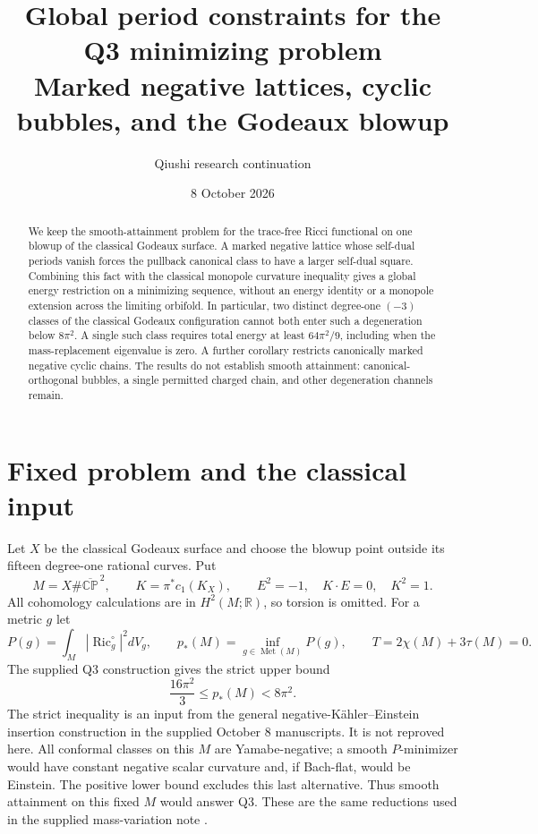\documentclass[11pt,a4paper]{article}
\title{Global period constraints for the Q3 minimizing problem\\[3pt]
\large Marked negative lattices, cyclic bubbles, and the Godeaux blowup}
\author{Qiushi research continuation}
\date{8 October 2026}
\theoremstyle{definition}
\theoremstyle{remark}
\newcommand{\Ric}{\operatorname{Ric}}
\newcommand{\CP}{\mathbb{CP}}
\newcommand{\Met}{\operatorname{Met}}
\begin{document}
\maketitle
\begin{abstract}
We keep the smooth-attainment problem for the trace-free Ricci functional on
one blowup of the classical Godeaux surface. A marked negative lattice whose
self-dual periods vanish forces the pullback canonical class to have a larger
self-dual square. Combining this fact with the classical monopole curvature
inequality gives a global energy restriction on a minimizing sequence, without
an energy identity or a monopole extension across the limiting orbifold.
In particular, two distinct degree-one $(-3)$ classes of the classical
Godeaux configuration cannot both enter such a degeneration below $8\pi^2$.
A single such class requires total energy at least $64\pi^2/9$, including
when the mass-replacement eigenvalue is zero. A further corollary restricts
canonically marked negative cyclic chains. The results do not establish smooth
attainment: canonical-orthogonal bubbles, a single permitted charged chain,
and other degeneration channels remain.
\end{abstract}

\section{Fixed problem and the classical input}
Let $X$ be the classical Godeaux surface and choose the blowup point outside
its fifteen degree-one rational curves. Put
\[
 M=X\#\overline{\CP}^{\,2},\qquad
 K=\pi^*c_1(K_X),\qquad E^2=-1,\quad K\cdot E=0,\quad K^2=1.
\]
All cohomology calculations are in $H^2(M;\mathbb R)$, so torsion is omitted.
For a metric $g$ let
\[
 P(g)=\int_M|\Ric_g^\circ|^2dV_g,\qquad
 p_*(M)=\inf_{g\in\Met(M)}P(g),\qquad T=2\chi(M)+3\tau(M)=0.
\]
The supplied Q3 construction gives the strict upper bound
\begin{equation}\label{eq:upper}
 \frac{16\pi^2}{3}\le p_*(M)<8\pi^2.
\end{equation}
The strict inequality is an input from the general negative-K\"ahler--Einstein
insertion construction in the supplied October 8 manuscripts. It is not
reproved here. All conformal classes on this $M$ are Yamabe-negative; a
smooth $P$-minimizer would have constant negative scalar curvature and,
if Bach-flat, would be Einstein. The positive lower bound excludes this
last alternative. Thus smooth attainment on this fixed $M$ would answer Q3.
These are the same reductions used in the supplied mass-variation note
\cite{Source,MassNote}.
\end{document}
